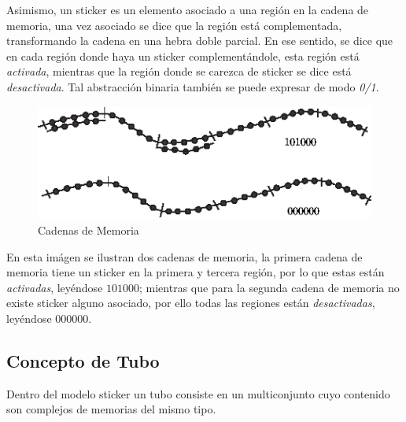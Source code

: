 \documentclass[12pt, letterpaper, twoside]{article}
\begin{document}
    Asimismo, un sticker es un elemento asociado a una región en la cadena de memoria, una vez asociado se dice que la región está complementada, transformando la cadena en una hebra doble parcial. En ese sentido, se dice que en cada región donde haya un sticker complementándole, esta región está \emph{activada}, mientras que la región donde se carezca de sticker se dice está \emph{desactivada}. Tal abstracción binaria también se puede expresar de modo \emph{0/1}.

    \newpage
    \begin{figure}[h!]
        \centering
        \includegraphics[width=\linewidth]{sticker.png}
        \caption{Cadenas de Memoria}
    \end{figure}

    En esta imágen se ilustran dos cadenas de memoria, la primera cadena de memoria tiene un sticker en la primera y tercera región, por lo que estas están \emph{activadas}, leyéndose $101000$; mientras que para la segunda cadena de memoria no existe sticker alguno asociado, por ello todas las regiones están \emph{desactivadas}, leyéndose $000000$.

    \subsection{Concepto de Tubo}
    Dentro del modelo sticker un tubo consiste en un multiconjunto cuyo contenido son complejos de memorias del mismo tipo.
\end{document}
